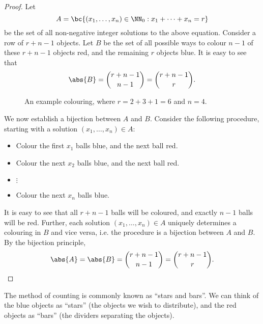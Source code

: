\begin{proof}
    Let \[A = \bc{(x_1, \dots, x_n) \in \NN_0 : x_1 + \dots + x_n = r}\] be the set of all non-negative integer solutions to the above equation. Consider a row of $r + n - 1$ objects. Let $B$ be the set of all possible ways to colour $n-1$ of these $r + n - 1$ objects red, and the remaining $r$ objects blue. It is easy to see that \[\abs{B} = \binom{r + n - 1}{n-1} = \binom{r + n - 1}{r}.\]

    \begin{figure}[H]
        \centering
        \caption{An example colouring, where $r = 2 + 3 + 1 = 6$ and $n = 4$.}
    \end{figure}
    
    We now establish a bijection between $A$ and $B$. Consider the following procedure, starting with a solution $(x_1, \dots, x_n) \in A$:
    \begin{itemize}
        \item Colour the first $x_1$ balls blue, and the next ball red.
        \item Colour the next $x_2$ balls blue, and the next ball red.
        \item[] $\vdots$
        \item Colour the next $x_n$ balls blue.
    \end{itemize}
    It is easy to see that all $r + n - 1$ balls will be coloured, and exactly $n-1$ balls will be red. Further, each solution $(x_1, \dots, x_n) \in A$ uniquely determines a colouring in $B$ and vice versa, i.e. the procedure is a bijection between $A$ and $B$. By the bijection principle, \[\abs{A} = \abs{B} = \binom{r + n - 1}{n - 1} = \binom{r + n - 1}{r}.\]
\end{proof}

The method of counting is commonly known as ``stars and bars''. We can think of the blue objects as ``stars'' (the objects we wish to distribute), and the red objects as ``bars'' (the dividers separating the objects).

